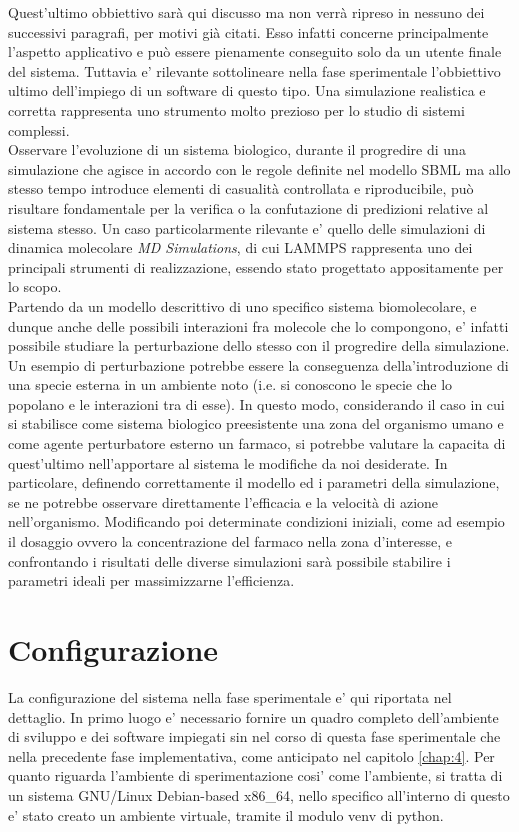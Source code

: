 \documentclass[Lau, oneside]{sapthesis}
\begin{document}
Quest'ultimo obbiettivo sarà qui discusso ma non verrà ripreso in nessuno dei successivi paragrafi, per motivi già citati. Esso infatti concerne principalmente l'aspetto applicativo e può essere pienamente conseguito solo da un utente finale del sistema. Tuttavia e' rilevante sottolineare nella fase sperimentale l'obbiettivo ultimo dell'impiego di un software di questo tipo.
Una simulazione realistica e corretta rappresenta uno strumento molto prezioso  per lo studio di sistemi complessi.\\
Osservare l’evoluzione di un sistema biologico, durante il progredire di una simulazione che agisce in accordo con le regole definite nel modello SBML ma allo stesso tempo introduce elementi di casualità controllata e riproducibile, può risultare fondamentale per la verifica o la confutazione di predizioni relative al sistema stesso. 
Un caso particolarmente rilevante e' quello delle simulazioni di dinamica molecolare \textit{MD Simulations}, di cui LAMMPS rappresenta uno dei principali strumenti di realizzazione, essendo stato progettato appositamente per lo scopo.\\
Partendo da un modello descrittivo di uno specifico sistema biomolecolare, e dunque anche delle possibili interazioni fra molecole che lo compongono, e' infatti possibile studiare la perturbazione dello stesso con il progredire della simulazione.
Un esempio di perturbazione potrebbe essere la conseguenza della’introduzione di una specie esterna in un ambiente noto (i.e. si conoscono le specie che lo popolano e le interazioni tra di esse). 
In questo modo, considerando il caso in cui si stabilisce come sistema biologico preesistente una zona del organismo umano e come agente perturbatore esterno un farmaco, si potrebbe valutare la capacita di quest'ultimo nell'apportare al sistema le modifiche da noi desiderate. In particolare, definendo correttamente il modello ed i parametri della simulazione, se ne potrebbe osservare direttamente l'efficacia e la velocità di azione nell'organismo. 
Modificando poi determinate condizioni iniziali, come ad esempio il dosaggio ovvero la concentrazione del farmaco nella zona d'interesse, e confrontando i risultati delle diverse simulazioni sarà possibile stabilire i parametri ideali per massimizzarne l'efficienza.\\


\newpage
\section{Configurazione}
\label{sec:conf}
La configurazione del sistema nella fase sperimentale e' qui riportata nel dettaglio. In primo luogo e' necessario fornire un quadro completo dell'ambiente di sviluppo e dei software impiegati sin nel corso di questa fase sperimentale che nella precedente fase implementativa, come anticipato nel capitolo \ref{chap:4}. Per quanto riguarda l'ambiente di sperimentazione cosi' come l'ambiente, si tratta di un sistema GNU/Linux Debian-based x86\_64, nello specifico all'interno di questo e' stato creato un ambiente virtuale, tramite il modulo venv di python.\\
\end{document}
